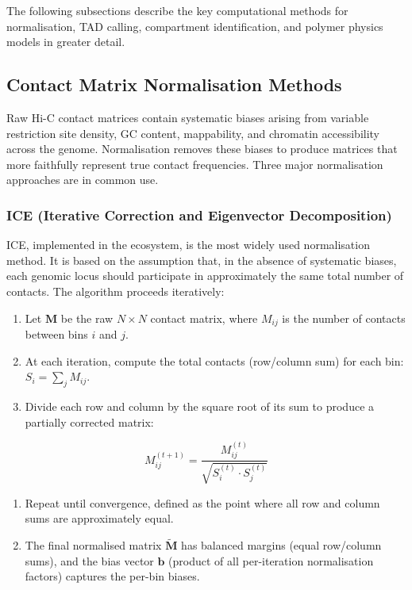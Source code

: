 The following subsections describe the key computational methods for normalisation, TAD calling, compartment identification, and polymer physics models in greater detail.

\subsection{Contact Matrix Normalisation Methods}
\label{subsec:3dgenome:normalisation}

Raw Hi-C contact matrices contain systematic biases arising from variable restriction site density, GC content, mappability, and chromatin accessibility across the genome. Normalisation removes these biases to produce matrices that more faithfully represent true contact frequencies. Three major normalisation approaches are in common use.

\subsubsection{ICE (Iterative Correction and Eigenvector Decomposition)}
\label{subsubsec:3dgenome:ice}

ICE, implemented in the  ecosystem, is the most widely used normalisation method. It is based on the assumption that, in the absence of systematic biases, each genomic locus should participate in approximately the same total number of contacts. The algorithm proceeds iteratively:

\begin{enumerate}[itemsep=2pt]
  \item Let $\mathbf{M}$ be the raw $N \times N$ contact matrix, where $M_{ij}$ is the number of contacts between bins $i$ and $j$.
  \item At each iteration, compute the total contacts (row/column sum) for each bin: $S_i = \sum_j M_{ij}$.
  \item Divide each row and column by the square root of its sum to produce a partially corrected matrix:
\end{enumerate}
\begin{equation}
\label{eq:3dgenome:ice-step}
M_{ij}^{(t+1)} = \frac{M_{ij}^{(t)}}{\sqrt{S_i^{(t)} \cdot S_j^{(t)}}}
\end{equation}
\begin{enumerate}[resume, itemsep=2pt]
  \item Repeat until convergence, defined as the point where all row and column sums are approximately equal.
  \item The final normalised matrix $\tilde{\mathbf{M}}$ has balanced margins (equal row/column sums), and the bias vector $\mathbf{b}$ (product of all per-iteration normalisation factors) captures the per-bin biases.
\end{enumerate}

